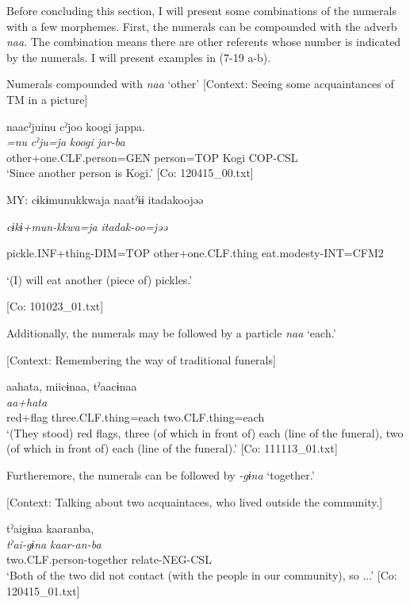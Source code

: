 Before concluding this section, I will present some combinations of the numerals with a few morphemes. First, the numerals can be compounded with the adverb \textit{naa}. The combination means there are other referents whose number is indicated by the numerals. I will present examples in (7-19 a-b).

\ea \label{ex:7:19}  Numerals compounded with \textit{naa} ‘other’
\ea \label{ex:7:19a}[Context: Seeing some acquaintances of TM in a picture]

\glll  naacˀjuinu  cˀjoo  koogi  jappa.\\
\textit{=nu}  \textit{cˀju=ja}  \textit{koogi}  \textit{jar-ba}\\
other+one.CLF.person=GEN  person=TOP  Kogi  COP-CSL\\
\glt ‘Since another person is Kogi.’ [Co: 120415\_00.txt]

\ex \label{ex:7:19b}MY:  cɨkɨmunukkwaja  naatˀɨɨ  {\textbar}itadak{\textbar}oojəə

      \textit{cɨkɨ+mun-kkwa=ja}  \textit{}  \textit{itadak-oo=jəə}

      pickle.INF+thing-DIM=TOP  other+one.CLF.thing  eat.modesty-INT=CFM2

      ‘(I) will eat another (piece of) pickles.’

      [Co: 101023\_01.txt]
  \z
\z

  Additionally, the numerals may be followed by a particle \textit{naa} ‘each.’

\ea \label{ex:7:20}  [Context: Remembering the way of traditional funerals]

\glll  aahata,  miicɨnaa,  tˀaacɨnaa\\
\textit{aa+hata}  \textit{}  \textit{}\\
red+flag  three.CLF.thing=each  two.CLF.thing=each\\
\glt ‘(They stood) red flags, three (of which in front of) each (line of the funeral), two (of which in front of) each (line of the funeral).’ [Co: 111113\_01.txt]
\z

  Furtheremore, the numerals can be followed by \textit{{}-gɨna} ‘together.’

\ea \label{ex:7:21}  [Context: Talking about two acquaintaces, who lived outside the community.]

\glll  tˀaigɨna  kaaranba,\\
\textit{tˀai-gɨna}  \textit{kaar-an-ba}\\
two.CLF.person-together  relate-NEG-CSL\\
\glt ‘Both of the two did not contact (with the people in our community), so ...’ [Co: 120415\_01.txt]
\z

